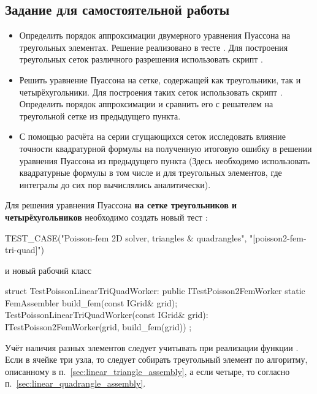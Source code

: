\subsection{Задание для самостоятельной работы}
\begin{itemize}
\item
Определить порядок аппроксимации двумерного уравнения Пуассона на треугольных элементах.
Решение реализовано в тесте .
Для построения треугольных сеток различного разрешения использовать
скрипт .
\item
Решить уравнение Пуассона на сетке, содержащей как треугольники, так и четырёхугольники.
Для построения таких сеток использовать скрипт .
Определить порядок аппроксимации и сравнить его с решателем на треугольной сетке из предыдущего пункта.
\item
С помощью расчёта на серии сгущающихся сеток исследовать влияние точности квадратурной формулы на полученную итоговую ошибку в решении
уравнения Пуассона из предыдущего пункта (Здесь необходимо использовать квадратурные формулы
в том числе и для треугольных элементов, где интегралы до сих пор вычислялись аналитически).
\end{itemize}

Для решения уравнения Пуассона {\bf на сетке треугольников и четырёхугольников} необходимо создать новый тест :
\begin{cppcode}
TEST_CASE("Poisson-fem 2D solver, triangles & quadrangles", "[poisson2-fem-tri-quad]")
\end{cppcode}
и новый рабочий класс
\begin{cppcode}
struct TestPoissonLinearTriQuadWorker: public ITestPoisson2FemWorker{
	static FemAssembler build_fem(const IGrid& grid);
	TestPoissonLinearTriQuadWorker(const IGrid& grid):
		ITestPoisson2FemWorker(grid, build_fem(grid)){ }
};
\end{cppcode}
Учёт наличия разных элементов следует учитывать при реализации функции .
Если в ячейке три узла, то следует собирать треугольный элемент по
алгоритму, описанному в п.~\ref{sec:linear_triangle_assembly},
а если четыре, то согласно п.~\ref{sec:linear_quadrangle_assembly}.

